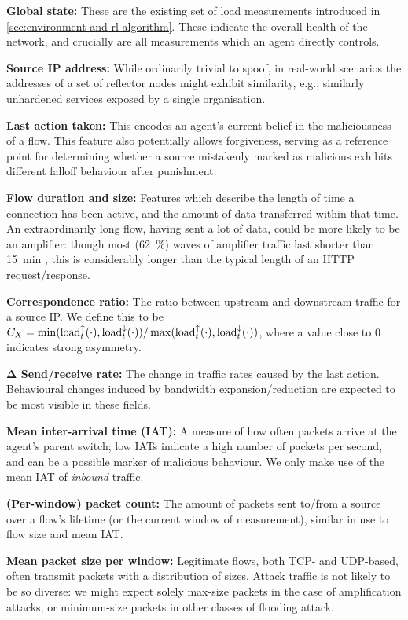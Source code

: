 \documentclass[conference, a4paper, 10pt, times]{IEEEtran}
\newcommand{\fakepara}[1]{\noindent\textbf{#1:}}
\begin{document}
\fakepara{Global state}
These are the existing set of load measurements introduced in \cref{sec:environment-and-rl-algorithm}.
These indicate the overall health of the network, and crucially are all measurements which an agent directly controls.

\fakepara{Source IP address}
While ordinarily trivial to spoof, in real-world scenarios the addresses of a set of reflector nodes might exhibit similarity, e.g., similarly unhardened services exposed by a single organisation.

\fakepara{Last action taken}
This encodes an agent's current belief in the maliciousness of a flow.
This feature also potentially allows forgiveness, serving as a reference point for determining whether a source mistakenly marked as malicious exhibits different falloff behaviour after punishment.

\fakepara{Flow duration and size}
Features which describe the length of time a connection has been active, and the amount of data transferred within that time.
An extraordinarily long flow, having sent a lot of data, could be more likely to be an amplifier: though most (\SI{62}{\percent}) waves of amplifier traffic last shorter than \SI{15}{\minute} \cite{DBLP:conf/raid/KramerKMNKYR15}, this is considerably longer than the typical length of an HTTP request/response.

\fakepara{Correspondence ratio}
The ratio between upstream and downstream traffic for a source IP.
We define this to be $C_X = \min(\operatorname{load}^{\uparrow}_{t}(\cdot), \operatorname{load}^{\downarrow}_{t}(\cdot))/\max(\operatorname{load}^{\uparrow}_{t}(\cdot), \operatorname{load}^{\downarrow}_{t}(\cdot))$, where a value close to 0 indicates strong asymmetry.

\fakepara{$\mathbf{\Delta}$ Send/receive rate}
The change in traffic rates caused by the last action.
Behavioural changes induced by bandwidth expansion/reduction are expected to be most visible in these fields.

\fakepara{Mean inter-arrival time (IAT)}
A measure of how often packets arrive at the agent's parent switch; low IATs indicate a high number of packets per second, and can be a possible marker of malicious behaviour.
We only make use of the mean IAT of \emph{inbound} traffic.

\fakepara{(Per-window) packet count}
The amount of packets sent to/from a source over a flow's lifetime (or the current window of measurement), similar in use to flow size and mean IAT.

\fakepara{Mean packet size per window}
Legitimate flows, both TCP- and UDP-based, often transmit packets with a distribution of sizes.
Attack traffic is not likely to be so diverse: we might expect solely max-size packets in the case of amplification attacks, or minimum-size packets in other classes of flooding attack.
\end{document}
